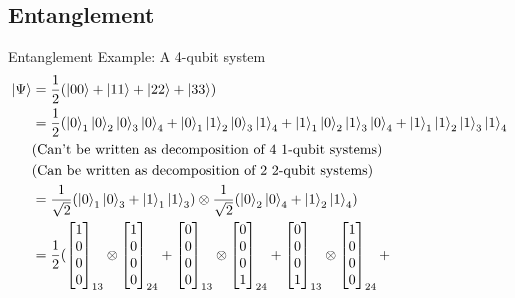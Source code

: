 \documentclass{beamer}
\begin{document}
\subsection{Entanglement}
\begin{frame}{Entanglement}
  {\tiny
    Example: A 4-qubit system
    \begin{align*}
      \ket{\Psi} &= \frac{1}{2} (\ket{00} + \ket{11} + \ket{22} + \ket{33}) \\
                 &= \frac{1}{2} (\ket{0}_1\ket{0}_2\ket{0}_3\ket{0}_4 + \ket{0}_1\ket{1}_2\ket{0}_3\ket{1}_4 + \ket{1}_1\ket{0}_2\ket{1}_3\ket{0}_4 + \ket{1}_1\ket{1}_2\ket{1}_3\ket{1}_4 \\
                   &  \text{(Can't be written as decomposition of 4 1-qubit systems)} \\
                   &  \text{(Can be written as decomposition of 2 2-qubit systems)} \\
                 &= \frac{1}{\sqrt{2}} (\ket{0}_1\ket{0}_3  + \ket{1}_1\ket{1}_3) \otimes  \frac{1}{\sqrt{2}} (\ket{0}_2\ket{0}_4  + \ket{1}_2\ket{1}_4) \\
                 &= \frac{1}{2} ( \begin{bmatrix} 1 \\ 0 \\ 0 \\ 0 \end{bmatrix}_{13} \otimes  \begin{bmatrix} 1 \\ 0 \\ 0 \\ 0 \end{bmatrix}_{24} +
                                  \begin{bmatrix} 0 \\ 0 \\ 0 \\ 0 \end{bmatrix}_{13} \otimes  \begin{bmatrix} 0 \\ 0 \\ 0 \\ 1 \end{bmatrix}_{24} +
                                  \begin{bmatrix} 0 \\ 0 \\ 0 \\ 1 \end{bmatrix}_{13} \otimes  \begin{bmatrix} 1 \\ 0 \\ 0 \\ 0 \end{bmatrix}_{24} +

\end{align*}}
\end{frame}
\end{document}
